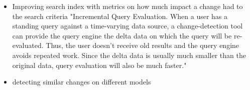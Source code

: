 
\begin{itemize}
	\item Improving search index with metrics on how much impact a change had to the search criteria
		\subitem "Incremental Query Evaluation. When a user has a standing query against a time-varying data source, a change-detection tool can provide the query engine the delta data on which the query will be re-evaluated. Thus, the user doesn’t receive old results and the query engine avoids repeated work. Since the delta data is usually much smaller than the original data, query evaluation will also be much faster." \cite{Wang2003}
	\item detecting similar changes on different models
\end{itemize}
